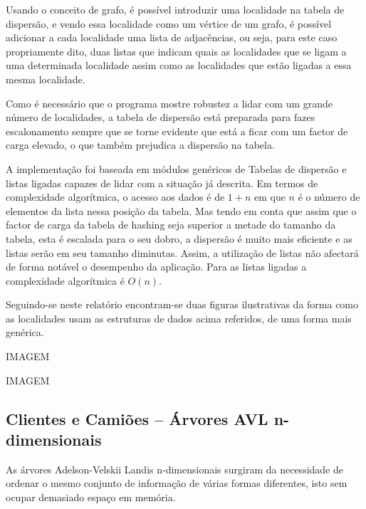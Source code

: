 \documentclass[a5paper,twocolumn, 11pt]{article}
\def\hyph{-\penalty0\hskip0pt\relax}
\begin{document}
Usando o conceito de grafo, é possível introduzir uma localidade na tabela de dispersão, e vendo essa localidade como um vértice de um grafo, é possível adicionar a cada localidade uma lista de adjacências, ou seja, para este caso propriamente dito, duas listas que indicam quais as localidades que se ligam a uma determinada localidade assim como as localidades que estão ligadas a essa mesma localidade.

Como é necessário que o programa mostre robustez a lidar com um grande número de localidades, a tabela de dispersão está preparada para fazes escalonamento sempre que se torne evidente que está a ficar com um factor de carga elevado, o que também prejudica a dispersão na tabela.

A implementação foi baseada em módulos genéricos de Tabelas de dispersão e listas ligadas capazes de lidar com a situação já descrita. Em termos de complexidade algorítmica, o acesso aos dados é de $1+n$ em que $n$ é o número de elementos da lista nessa posição da tabela. Mas tendo em conta que assim que o factor de carga da tabela de hashing seja superior a metade do tamanho da tabela, esta é escalada para o seu dobro, a dispersão é muito mais eficiente e as listas serão em seu tamanho diminutas. Assim, a utilização de listas não afectará de forma notável o desempenho da aplicação. Para as listas ligadas a complexidade algorítmica é $O(n)$.

Seguindo-se neste relatório encontram-se duas figuras ilustrativas da forma como as localidades usam as estruturas de dados acima referidos, de uma forma mais genérica.

IMAGEM

IMAGEM

\clearpage
\subsection[Clientes e Camiões]{Clientes e Camiões -- Árvores AVL n\hyph{}dimensionais}
As árvores Adelson-Velskii Landis n\hyph{}dimensionais surgiram da necessidade de ordenar o mesmo conjunto de informação de várias formas diferentes, isto sem ocupar demasiado espaço em memória.
\end{document}
